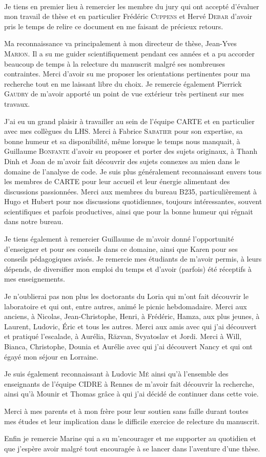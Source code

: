 ~\\

Je tiens en premier lieu à remercier les membre du jury qui ont accepté d'évaluer mon travail de thèse et en particulier Frédéric \textsc{Cuppens} et Hervé \textsc{Debar} d'avoir pris le temps de relire ce document en me faisant de précieux retours.

Ma reconnaissance va principalement à mon directeur de thèse, Jean-Yves \textsc{Marion}. Il a su me guider scientifiquement pendant ces années et a pu accorder beaucoup de temps à la relecture du manuscrit malgré ses nombreuses contraintes.
Merci d'avoir su me proposer les orientations pertinentes pour ma recherche tout en me laissant libre du choix.
Je remercie également Pierrick \textsc{Gaudry} de m'avoir apporté un point de vue extérieur très pertinent sur mes travaux.

J'ai eu un grand plaisir à travailler au sein de l'équipe CARTE et en particulier avec mes collègues du LHS.
Merci à Fabrice \textsc{Sabatier} pour son expertise, sa bonne humeur et sa disponibilité, même lorsque le temps nous manquait,
à Guillaume \textsc{Bonfante} d'avoir su proposer et porter des sujets originaux,
à Thanh Dinh et Joan de m'avoir fait découvrir des sujets connexes au mien dans le domaine de l'analyse de code.
Je suis plus généralement reconnaissant envers tous les membres de CARTE pour leur accueil et leur énergie alimentant des discussions passionnées.
Merci aux membres du bureau B235, particulièrement à Hugo et Hubert pour nos discussions quotidiennes, toujours intéressantes, souvent scientifiques et parfois productives, ainsi que pour la bonne humeur qui régnait dans notre bureau.

Je tiens également à remercier Guillaume de m'avoir donné l'opportunité d'enseigner et pour ses conseils dans ce domaine, ainsi que Karen pour ses conseils pédagogiques avisés. 
Je remercie mes étudiants de m'avoir permis, à leurs dépends, de diversifier mon emploi du temps et d'avoir (parfois) été réceptifs à mes enseignements.

Je n'oublierai pas non plus les doctorants du Loria qui m'ont fait découvrir le laboratoire et qui ont, entre autres, animé le picnic hebdomadaire. Merci aux anciens, à Nicolas, Jean-Christophe, Henri, à Frédéric, Hamza, aux plus jeunes, à Laurent, Ludovic, Éric et tous les autres.
Merci aux amis avec qui j'ai découvert et pratiqué l'escalade, à Aurélia, R\u{a}zvan, Svyatoslav et Jordi.
Merci à Will, Bianca, Christophe, Dounia et Aurélie avec qui j'ai découvert Nancy et qui ont égayé mon séjour en Lorraine.

Je suis également reconnaissant à Ludovic \textsc{Mé} ainsi qu'à l'ensemble des enseignants de l'équipe CIDRE à Rennes de m'avoir fait découvrir la recherche, ainsi qu'à Mounir et Thomas grâce à qui j'ai décidé de continuer dans cette voie.

Merci à mes parents et à mon frère pour leur soutien sans faille durant toutes mes études et leur implication dans le difficile exercice de relecture du manuscrit.

Enfin je remercie Marine qui a su m'encourager et me supporter au quotidien et que j'espère avoir malgré tout encouragée à se lancer dans l'aventure d'une thèse.